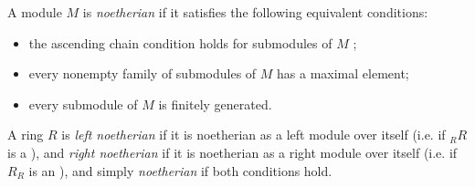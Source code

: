 \documentclass[12pt]{article}
\begin{document}
A module $M$ is {\it noetherian} if it satisfies the following equivalent conditions:
\begin{itemize}
\item the ascending chain condition holds for submodules of $M$ ;
\item every nonempty family of submodules of $M$ has a maximal element;
\item every submodule of $M$ is finitely generated.
\end{itemize}

A ring $R$ is {\it left noetherian} 
if it is noetherian as a left module over itself 
(i.e. if $_RR$ is a ), 
and {\it right noetherian} 
if it is noetherian as a right module over itself 
(i.e. if $R_R$ is an ), 
and simply {\it noetherian} 
if both conditions hold.
\end{document}
